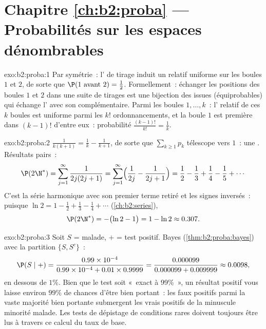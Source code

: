 \section*{Chapitre \ref{ch:b2:proba} --- Probabilités sur les espaces dénombrables}

\begin{solution}{exo:b2:proba:1}
Par symétrie~: l' de tirage induit un  relatif uniforme
sur les boules $1$ et $2$, de sorte que $\P(1 \text{ avant } 2) =
\frac12$. Formellement~: échanger les positions des boules $1$ et $2$
dans une suite de tirages est une bijection des issues
(équiprobables) qui échange l' avec son complémentaire. Parmi les boules
$1, \dots, k$~: l' relatif de ces $k$ boules est uniforme
parmi les $k!$ ordonnancements, et la boule $1$ est première dans $(k-1)!$
d'entre eux~: probabilité $\frac{(k-1)!}{k!} = \frac1k$.
\end{solution}

\begin{solution}{exo:b2:proba:2}
$\frac{1}{k(k+1)} = \frac1k - \frac1{k+1}$, de sorte que $\sum_{k\geq1} p_k$
télescope vers $1$~: une . Résultats pairs~:
\[
\P(2\N^*) = \sum_{j=1}^{\infty}\frac{1}{2j(2j+1)}
= \sum_{j=1}^{\infty}\Bigl(\frac{1}{2j} - \frac{1}{2j+1}\Bigr)
= \frac12 - \frac13 + \frac14 - \frac15 + \cdots
\]
C'est la série harmonique  avec son premier terme
retiré et les signes inversés~: puisque $\ln 2 = 1 - \frac12 + \frac13 -
\frac14 + \cdots$ (\cref{ch:b2:series}),
\[
\P(2\N^*) = -\bigl(\ln 2 - 1\bigr) = 1 - \ln 2 \approx 0.307 .
\]
\end{solution}

\begin{solution}{exo:b2:proba:3}
Soit $S$ = malade, $+$ = test positif. Bayes
(\cref{thm:b2:proba:bayes}) avec la partition $\{S, S^c\}$~:
\[
\P(S \mid +)
= \frac{0.99 \times 10^{-4}}
       {0.99 \times 10^{-4} + 0.01 \times 0.9999}
= \frac{0.000099}{0.000099 + 0.009999}
\approx 0.0098 ,
\]
en dessous de $1\%$. Bien que le test soit «~exact à 99\%~», un résultat
positif vous laisse environ $99\%$ de chances d'être bien portant~: les faux
positifs parmi la vaste majorité bien portante submergent les vrais
positifs de la minuscule minorité malade. Les tests de dépistage de
conditions rares doivent toujours être lus à travers ce calcul du
taux de base.
\end{solution}

